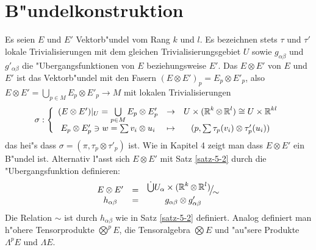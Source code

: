 \section{B"undelkonstruktion}
Es seien $E$ und $E'$ Vektorb"undel vom Rang $k$ und $l$. Es bezeichnen stets $\tau$ und $\tau'$ lokale Trivialisierungen mit dem gleichen Trivialisierungsgebiet $U$ sowie $g_{\alpha\beta}$ und $g'_{\alpha\beta}$ die "Ubergangsfunktionen von $E$ beziehungsweise $E'$. Das  $E \otimes E'$ von $E$ und $E'$ ist das Vektorb"undel mit den Fasern $(E \otimes E')_p = E_p \otimes E'_p$, also $E \otimes E' = \bigcup_{p \in M} E_p \otimes E'_p \to M$ mit lokalen Trivialisierungen
	\[ \sigma: \left\{\begin{array}{ccc} (E \otimes E')|_U = \bigcup\limits_{p \in M} E_p \otimes E'_p &\to& U \times (\operatorname{\mathbb{R}}^k \otimes \operatorname{\mathbb{R}}^l) \cong U \times \operatorname{\mathbb{R}}^{kl} \\
		E_p \otimes E'_p \ni w = \sum v_i \otimes u_i &\mapsto& (p, \sum \tau_p(v_i) \otimes \tau'_p(u_i)) \end{array}\right. \]
das hei"s dass $\sigma = (\pi, \tau_p \otimes \tau'_p)$ ist. Wie in Kapitel 4 zeigt man dass $E \otimes E'$ ein B"undel ist. Alternativ l"asst sich $E \otimes E'$ mit Satz \ref{satz-5-2} durch die "Ubergangsfunktion definieren:
	\[\begin{array}{ccc} E \otimes E' &=& \FakRaum{\dot \bigcup U_{\alpha} \X (\R^k \otimes \R^l)}{\sim} \\
		h_{\alpha\beta} &=& g_{\alpha\beta} \otimes g'_{\alpha\beta} \end{array}\]
Die Relation $\sim$ ist durch $h_{\alpha\beta}$ wie in Satz \ref{satz-5-2} definiert. Analog definiert man h"ohere Tensorprodukte $\bigotimes^pE$, die Tensoralgebra $\bigotimes E$ und "au"sere Produkte $\Lambda^pE$ und $\Lambda E$.

